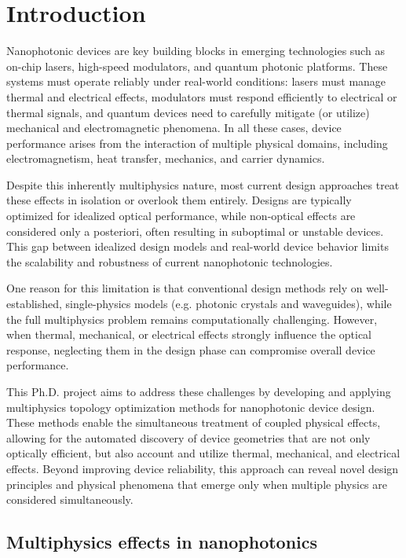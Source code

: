 \chapter{Introduction}

Nanophotonic devices are key building blocks in emerging technologies such as on-chip lasers, high-speed modulators, and quantum photonic platforms. 
These systems must operate reliably under real-world conditions: lasers must manage thermal and electrical effects, modulators must respond efficiently 
to electrical or thermal signals, and quantum devices need to carefully mitigate (or utilize) mechanical and electromagnetic phenomena. In all these cases, device 
performance arises from the interaction of multiple physical domains, including electromagnetism, heat transfer, mechanics, and carrier dynamics.

Despite this inherently multiphysics nature, most current design approaches treat these effects in isolation or overlook them entirely. Designs are typically optimized 
for idealized optical performance, while non-optical effects are considered only a posteriori,
often resulting in suboptimal or unstable devices. This gap between idealized design models and real-world device behavior limits the scalability and robustness of current nanophotonic technologies.

One reason for this limitation is that conventional design methods rely on well-established, single-physics models (e.g. photonic crystals and waveguides), while the full multiphysics problem remains computationally challenging.
However, when thermal, mechanical, or electrical effects strongly influence the optical response, neglecting them in the design phase can compromise overall device performance.

This Ph.D. project aims to address these challenges by developing and applying multiphysics topology optimization methods for nanophotonic device design. These methods enable the simultaneous treatment of coupled physical effects, 
allowing for the automated discovery of device geometries that are not only optically efficient, but also account and utilize thermal, mechanical, and electrical effects. Beyond improving device reliability, this approach can reveal 
novel design principles and physical phenomena that emerge only when multiple physics are considered simultaneously.

\section{Multiphysics effects in nanophotonics}

